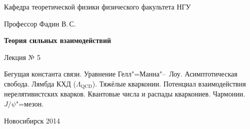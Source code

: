 \documentclass[12pt,pagesize,paper=landscape,paper=192mm:108mm]{scrbook}
\begin{document}
\begin{titlepage}
\begin{center}
    Кафедра теоретической физики физического факультета НГУ
    \medskip

    \Large
    Профессор Фадин В.\,С.

    \huge
    \textbf{Теория сильных взаимодействий}
    \smallskip
    
    \Large
    Лекция № 5
    \vfill
    
    \normalsize
    \begin{minipage}{0.65\linewidth}
      Бегущая константа связи. Уравнение
      Гелл"=Манна"--~Лоу. Асимптотическая свобода. Лямбда КХД
      ($\Lambda_{\text{QCD}}$). Тяжёлые кварконии. Потенциал
      взаимодействия нерелятивистских кварков. Квантовые числа и
      распады кваркониев. Чармонии. $J/\psi$"=мезон.
    \end{minipage}
    \vfill
    
    \normalsize \ccbysa\hspace{0.5em}  Новосибирск 2014   
  \end{center}
\end{titlepage}
\end{document}
